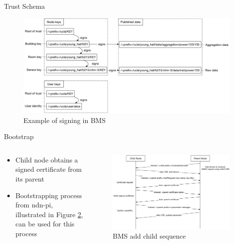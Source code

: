 \documentclass[final,hyperref={pdfpagelabels=false},16pt]{beamer}
\begin{document}
\begin{frame}[t]
\begin{columns}[t]
\begin{column}{.465\textwidth}
\begin{block}{Trust Schema}
\begin{figure}
\includegraphics[width=0.95\linewidth]{bms-signing-verification}
\caption{Example of signing in BMS}
\label{fig:bms-signing-example}
\end{figure}

Bootstrap

\begin{columns}[T]

\begin{column}{.40\textwidth}

\begin{itemize}
\item{Child node obtains a signed certificate from its parent}
\item{Bootstrapping process from ndn-pi, illustrated in Figure \ref{fig:add-child-sequence}, can be used for this process}
\end{itemize}
\end{column}

\begin{column}{.60\textwidth}
\begin{figure}
\includegraphics[width=\linewidth]{bms-add-child-sequence}
\caption{BMS add child sequence}
\label{fig:add-child-sequence}
\end{figure}
\end{column}


\end{columns}
\end{block}
\end{column}
\end{columns}
\end{frame}
\end{document}
